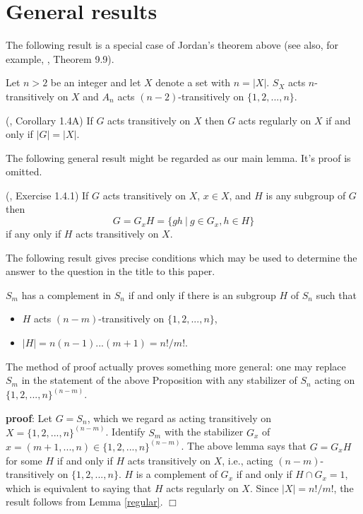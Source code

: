 \section{General results}

The following result is a special case of Jordan's theorem
above (see also, for example, \cite{R}, Theorem 9.9).

\begin{lemma} Let $n>2$ be an integer and let
$X$ denote a set with $n=|X|$.
$S_X$ acts $n$-transitively
on $X$ and $A_n$ acts $(n-2)$-transitively
on $\{1,2,...,n\}$.
\end{lemma}

\begin{lemma} (\cite{DM}, Corollary 1.4A)
\label{regular}
If $G$ acts transitively on $X$ then $G$ acts regularly
on $X$ if and only if $|G|=|X|$. 
\end{lemma}

The following general result might be regarded as our
main lemma. It's proof is omitted.

\begin{lemma} (\cite{DM}, Exercise 1.4.1)
If $G$ acts transitively on $X$, $x\in X$,
and $H$ is any subgroup of $G$ then
\[
G=G_xH=\{gh\ |\ g\in G_x,h\in H\}
\]
if any only if $H$ acts transitively on $X$. 
\end{lemma}

The following result gives precise conditions which may be
used to determine the answer to the question in the title
to this paper.

\begin{proposition} $S_m$ has a complement in $S_n$ if and 
only if there is an subgroup $H$ of $S_n$ such that
\begin{itemize}
\item
 $H$ acts $(n-m)$-transitively on $\{1,2,...,n\}$,
\item
$|H|=n(n-1)...(m+1)=n!/m!$.
\end{itemize}
\label{complement}
\end{proposition}

\begin{remark} The method of proof actually
proves something more general: one may replace $S_m$ in the 
statement of the above Proposition with any
stabilizer of $S_n$ acting on $\{1,2,...,n\}^{(n-m)}$. 
\end{remark}

{\bf proof}: Let $G=S_n$, which we regard as acting 
transitively on $X=\{1,2,...,n\}^{(n-m)}$.
Identify $S_m$ with the stabilizer $G_x$ of
$x=(m+1,...,n)\in \{1,2,...,n\}^{(n-m)}$. The above lemma says
that $G=G_xH$ for some $H$ if and only if $H$ acts 
transitively on $X$, i.e., 
acting $(n-m)$-transitively on $\{1,2,...,n\}$.
$H$ is a complement of $G_x$ if and only if
$H \cap G_x=1$, which is equivalent to saying that $H$ acts
regularly on $X$. Since $|X|=n!/m!$, the result follows from 
Lemma \ref{regular}. $\Box$

